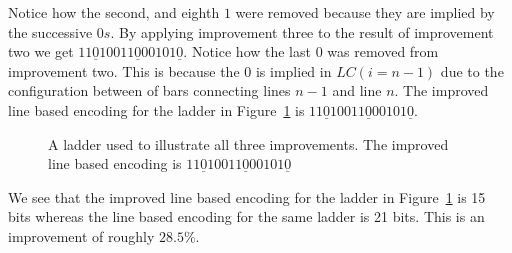 Notice how the second, and eighth $1$ were removed because they are implied by 
the successive $0s$. By applying improvement three to the result of improvement 
two we get $11\underline{0}10011\underline{0}00101\underline{0}$. Notice how the last $0$ 
was removed from improvement two. This is because the $0$ is implied in $LC(i=n-1)$
due to the configuration between of bars connecting lines $n-1$ and line $n$. The improved line based encoding 
for the ladder in Figure~\ref{Fig:allthree} 
is $11\underline{0}10011\underline{0}00101\underline{0}$.
\begin{figure}[h]
    \centering
     \caption{A ladder used to illustrate all three improvements. The improved line based encoding is $11\underline{0}10011\underline{0}00101\underline{0}$}
     \label{Fig:allthree}
\end{figure}

We see that the improved line based encoding for the ladder in Figure~\ref{Fig:allthree} is 15 bits whereas the line based encoding for the 
same ladder is 21 bits. This is an improvement of roughly $28.5\%$.  